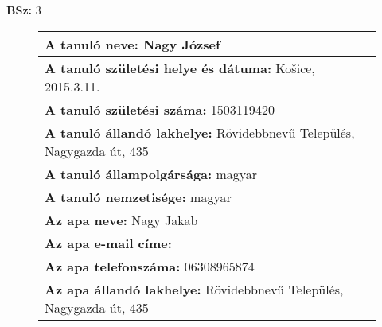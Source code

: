 \documentclass[10pt,a4paper]{article}
\begin{document}
    \vfill
    \textbf{BSz: }3
\newpage
    \begin{figure}[!ht]
    \begin{tabular}{|m{\textwidth}|}
    \hline \vspace{3pt}
    \textbf{A tanuló neve:} \hspace{0.5cm} Nagy József \vspace{3pt} \\
\hline\vspace{3pt}
\textbf{A tanuló születési helye és dátuma:} \hspace{0.5cm} Košice, 2015.3.11. \vspace{3pt} \\
\hline\vspace{3pt}
\textbf{A tanuló születési száma:} \hspace{0.5cm} 1503119420 \vspace{3pt} \\
\hline\vspace{3pt}
\textbf{A tanuló állandó lakhelye:} \hspace{0.5cm} Rövidebbnevű Település, Nagygazda út, 435 \vspace{3pt} \\
\hline\vspace{3pt}
\textbf{A tanuló állampolgársága:} \hspace{0.5cm} magyar \vspace{3pt} \\
\hline\vspace{3pt}
\textbf{A tanuló nemzetisége:} \hspace{0.5cm} magyar \vspace{3pt} \\
\hline\vspace{3pt}
\textbf{Az apa neve:} \hspace{0.5cm} Nagy Jakab \vspace{3pt} \\
\hline\vspace{3pt}
\textbf{Az apa e-mail címe:} \hspace{0.5cm}  \vspace{3pt} \\
\hline\vspace{3pt}
\textbf{Az apa telefonszáma:} \hspace{0.5cm} 06308965874 \vspace{3pt} \\
\hline\vspace{3pt}
\textbf{Az apa állandó lakhelye:} \hspace{0.5cm} Rövidebbnevű Település, Nagygazda út, 435 \vspace{3pt} \\

\end{tabular}
\end{figure}
\end{document}
